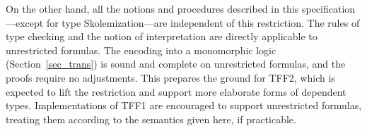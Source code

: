 On the other hand, all the notions and procedures described in this
specification---except for type Skolemization---are independent of this
restriction. The rules of type checking and the notion of interpretation are
directly applicable to unrestricted formulas. The encoding into a monomorphic
logic (Section~\ref{sec_trans}) is sound and complete on unrestricted formulas,
and the proofs require
no adjustments. This prepares the ground for TFF2, which is expected to lift the
restriction and support more elaborate forms of dependent types. Implementations
of TFF1 are encouraged to support unrestricted formulas, treating them according
to the semantics given here, if practicable.


